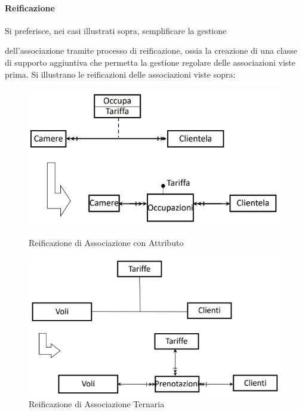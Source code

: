 \documentclass{article}
\begin{document}
\paragraph{Reificazione} Si preferisce, nei casi illustrati sopra, semplificare la gestione 

dell'associazione tramite processo di reificazione, ossia la creazione di una classe di supporto aggiuntiva che permetta la gestione
regolare delle associazioni viste prima. Si illustrano le reificazioni delle associazioni viste sopra:

\vspace*{15px}

\begin{figure}[htbp]
    \centering
    \begin{minipage}{0.45\textwidth}
        \centering
        \includegraphics[width=\linewidth]{img/esempioReificazione1.png}
        \caption{Reificazione di Associazione con Attributo}
    \end{minipage}
    \hfill
    \begin{minipage}{0.45\textwidth}
        \centering
        \includegraphics[width=\linewidth]{img/esempioReificazione2.png}
        \caption{Reificazione di Associazione Ternaria}
    \end{minipage}
\end{figure}
\end{document}
